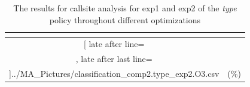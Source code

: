 \begin{table}[!htbp]
{\begin{tabular}{|c|c}
\multicolumn{1}{c}{}
	\\\midrule
	\csvreader[ late after line=\\, late after last line=\\\bottomrule]{../MA_Pictures/classification_comp2.type_exp2.O3.csv}{
}
	{\csvcoliv (\csvcolv \%) & \csvcolvi (\csvcolvii\%)}%


    	\end{tabular}
}
		\caption {The results for callsite analysis for exp1 and exp2 of the \textit{type} policy throughout different optimizations}
		\label{tbl:CSexp12TYPE}
\end{table}


